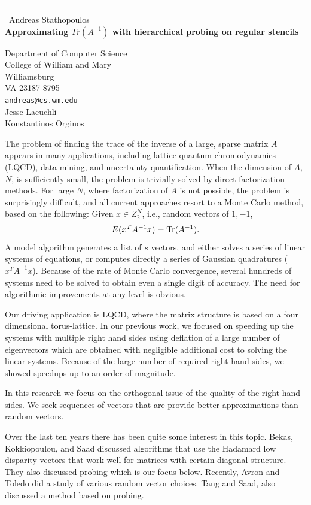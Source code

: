 \documentclass{report}
\begin{document}
\begin{center}
\rule{6in}{1pt} \
{\large Andreas Stathopoulos \\
{\bf Approximating $Tr(A^{-1})$ with hierarchical probing on regular stencils}}

Department of Computer Science \\ College of William and Mary \\ Williamsburg \\ VA 23187-8795
\\
{\tt andreas@cs.wm.edu}\\
Jesse Laeuchli \\
Konstantinos Orginos\end{center}

The problem of finding the trace of the inverse of a large, sparse
matrix $A$ appears in many applications, including lattice quantum
chromodynamics (LQCD), data mining, and uncertainty quantification.
When the dimension of $A$, $N$, is sufficiently small, the problem is
trivially solved by direct factorization methods.
For large $N$, where factorization of $A$ is not possible, the problem is
surprisingly difficult, and all current approaches resort to a Monte
Carlo method, based on the following:
Given $x \in Z_2^N$, i.e., random vectors of $1,-1$,
$$ E( x^T A^{-1} x) = {\rm Tr}(A^{-1}).$$
A model algorithm generates a list of $s$ vectors, and either solves
a series of linear systems of equations, or computes directly a series
of Gaussian quadratures ($x^TA^{-1}x$).
Because of the rate of Monte Carlo convergence, several hundreds
of systems need to be solved to obtain even a single digit of
accuracy. The need for algorithmic improvements at any level is obvious.

Our driving application is LQCD, where the matrix structure is based on
a four dimensional torus-lattice.
In our previous work, we focused on speeding up the systems with multiple
right hand sides using deflation of a large number of eigenvectors which
are obtained with negligible additional cost to solving the linear systems.
Because of the large number of required right hand sides, we showed
speedups up to an order of magnitude.

In this research we focus on the orthogonal issue of the quality of the
right hand sides. We seek sequences of vectors that are provide better
approximations than random vectors.

Over the last ten years there has been quite some interest in this topic.
Bekas, Kokkiopoulou, and Saad discussed algorithms that use the Hadamard
low disparity vectors that work well for matrices with certain diagonal
structure. They also discussed probing which is our focus below.
Recently, Avron and Toledo did a study of various random vector choices.
Tang and Saad, also discussed a method based on probing.
\end{document}
